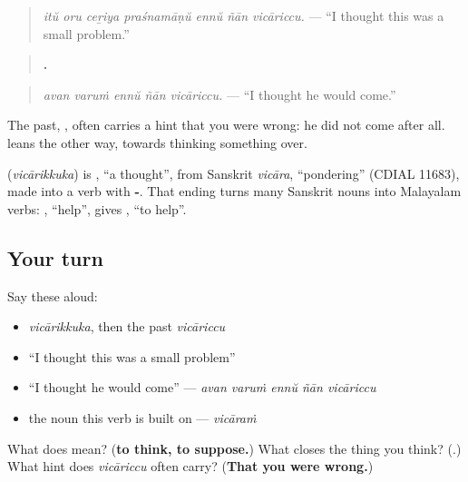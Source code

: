 \begin{quote}
\emph{itŭ oru ceṟiya praśnamāṇŭ ennŭ ñān vicāriccu.} — \textquotedblleft{}I thought this was a small problem.\textquotedblright{}
\end{quote}

\begin{quote}
\textbf{    .}
\end{quote}

\begin{quote}
\emph{avan varuṁ ennŭ ñān vicāriccu.} — \textquotedblleft{}I thought he would come.\textquotedblright{}
\end{quote}

The past, \textbf{}, often carries a hint that you were wrong: he did not come after all. \textbf{} leans the other way, towards thinking something over.

\begin{cousinweb}
\textbf{} (\emph{vicārikkuka}) is \textbf{}, \textquotedblleft{}a thought\textquotedblright{}, from Sanskrit \emph{vicāra}, \textquotedblleft{}pondering\textquotedblright{} (CDIAL 11683), made into a verb with \textbf{-}. That ending turns many Sanskrit nouns into Malayalam verbs: \textbf{}, \textquotedblleft{}help\textquotedblright{}, gives \textbf{}, \textquotedblleft{}to help\textquotedblright{}.
\end{cousinweb}

\subsection*{Your turn}
Say these aloud:

\begin{itemize}
\raggedright
  \item \emph{vicārikkuka}, then the past \emph{vicāriccu}
  \item \textquotedblleft{}I thought this was a small problem\textquotedblright{}
  \item \textquotedblleft{}I thought he would come\textquotedblright{} — \emph{avan varuṁ ennŭ ñān vicāriccu}
  \item the noun this verb is built on — \emph{vicāraṁ}
\end{itemize}

\begin{tcolorbox}[breakable,colback=teal!4,colframe=teal!35!black,title={Before you move on}]
What does \textbf{} mean? (\textbf{to think, to suppose.}) What closes the thing you think? (\textbf{}.) What hint does \emph{vicāriccu} often carry? (\textbf{That you were wrong.})
\end{tcolorbox}
